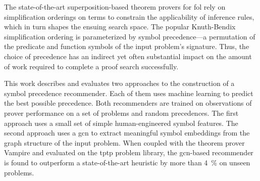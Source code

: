 The state-of-the-art superposition-based theorem provers for \acrlong{fol} rely on simplification orderings on terms to constrain the applicability of inference rules,
which in turn shapes the ensuing search space.
The popular Knuth-Bendix simplification ordering is parameterized by symbol precedence—a permutation of the predicate and function symbols of the input problem’s signature.
Thus, the choice of precedence has an indirect yet often substantial impact on the amount of work required to complete a proof search successfully.

This work describes and evaluates two approaches to the construction of a symbol precedence recommender.
Each of them uses machine learning to predict the best possible precedence.
Both recommenders are trained on observations of prover performance on a set of problems and random precedences.
The first approach uses a small set of simple human-engineered symbol features.
The second approach uses a \acrfull{gcn} to extract meaningful symbol embeddings from the graph structure of the input problem.
When coupled with the theorem prover Vampire and evaluated on the \acrshort{tptp} problem library, the \acrshort{gcn}-based recommender is found to outperform a state-of-the-art heuristic by more than \SI{4}{\percent} on unseen problems.
